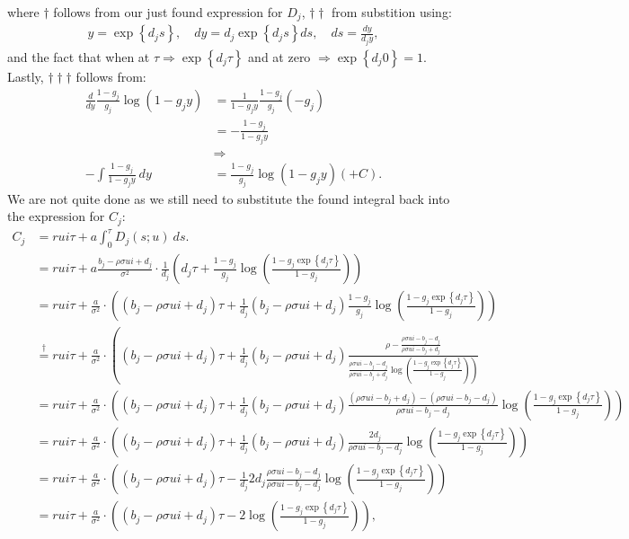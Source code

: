\documentclass[12pt]{article}
\numberwithin{equation}{section}
\begin{document}
where $\dagger$ follows from our just found expression for $D_j$,
$\dagger\dagger$ from substition using:
\begin{align*}
    y=\exp\left\{d_j s\right\}, \quad dy=d_j\exp\left\{d_j s\right\}ds,\quad ds=\frac{dy}{d_j y},
\end{align*}
and the fact that when at $\tau \Rightarrow \exp\left\{d_j \tau\right\}$ and at
zero $\Rightarrow \exp\left\{d_j 0 \right\}=1$. Lastly, $\dagger\dagger\dagger$ follows from:
\begin{align*}
    \frac{d}{dy}\frac{1-g_j}{g_j}\log{(1-g_j y)}&=\frac{1}{1-g_jy}\frac{1-g_j}{g_j}(-g_j)\\
    &=-\frac{1-g_j}{1-g_jy}\\
    &\Rightarrow\\
    -\int\frac{1-g_j}{1-g_jy}\:dy&=\frac{1-g_j}{g_j}\log{(1-g_jy)}(+C).
\end{align*}
\newpage
We are not quite done as we still need to substitute the found integral back
into the expression for $C_j$:
\begin{align*}
    C_j&=rui\tau+a\int_0^\tau D_j(s;u)\:ds.\\
    & =rui\tau+a \frac{b_j-\rho \sigma u i+d_j}{\sigma^2} \cdot\frac{1}{d_j}\left(d_j \tau+\frac{1-g_j}{g_j} \log \left(\frac{1-g_j \exp\left\{d_j \tau\right\}}{1-g_j}\right)\right) \\
    & =rui\tau+\frac{a}{\sigma^2}\cdot\left(\left(b_j-\rho \sigma u i+d_j\right) \tau+\frac{1}{d_j}\left(b_j-\rho \sigma u i+d_j\right) \frac{1-g_j}{g_j} \log \left(\frac{1-g_j \exp\left\{d_j \tau\right\}}{1-g_j}\right)\right) \\
    & \overset{\dagger}{=}rui\tau+\frac{a}{\sigma^2}\cdot\left(\left(b_j-\rho \sigma u i+d_j\right) \tau+\frac{1}{d_j}\left(b_j-\rho \sigma u i+d_j\right) \frac{\rho-\frac{\rho \sigma u i-b_j-d_j}{\rho \sigma u i-b_j+d_j}}{\left.\frac{\rho \sigma u i-b_j-d_j}{\rho \sigma u i-b_j+d_j} \log \left(\frac{1-g_j \exp\left\{d_j \tau\right\}}{1-g_j}\right)\right)}\right. \\
    &=rui\tau+\frac{a}{\sigma^2}\cdot\left(\left(b_j-\rho \sigma u i+d_j\right) \tau+\frac{1}{d_j}\left(b_j-\rho \sigma u i+d_j\right) \frac{\left(\rho \sigma u i-b_j+d_j\right)-\left(\rho \sigma u i-b_j-d_j\right)}{\rho \sigma u i-b_j-d_j} \log \left(\frac{1-g_j \exp\left\{d_j \tau\right\}}{1-g_j}\right)\right) \\
    & =rui\tau+\frac{a}{\sigma^2}\cdot\left(\left(b_j-\rho \sigma u i+d_j\right) \tau+\frac{1}{d_j}\left(b_j-\rho \sigma u i+d_j\right) \frac{2 d_j}{\rho \sigma u i-b_j-d_j} \log \left(\frac{1-g_j \exp\left\{d_j \tau\right\}}{1-g_j}\right)\right) \\
    & =rui\tau+\frac{a}{\sigma^2}\cdot\left(\left(b_j-\rho \sigma u i+d_j\right) \tau-\frac{1}{d_j} 2 d_j \frac{\rho \sigma u i-b_j-d_j}{\rho \sigma u i-b_j-d_j} \log \left(\frac{1-g_j \exp\left\{d_j \tau\right\}}{1-g_j}\right)\right) \\
    &=rui\tau+\frac{a}{\sigma^2}\cdot\left(\left(b_j-\rho \sigma u i+d_j\right) \tau-2 \log \left(\frac{1-g_j \exp\left\{d_j \tau\right\}}{1-g_j}\right)\right),
\end{align*}
\end{document}
